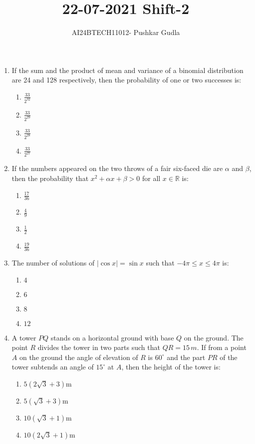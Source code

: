 \documentclass[journal,12pt,onecolumn]{IEEEtran}
\theoremstyle{remark}
\begin{document}

\vspace{3cm}

\title{\textbf{22-07-2021 Shift-2}}
\author{AI24BTECH11012- Pushkar Gudla}
\maketitle
\bigskip

\renewcommand{\thefigure}{\theenumi}
\renewcommand{\thetable}{\theenumi}
\setlength{\columnsep}{2.5em}


\begin{enumerate}
    \item If the sum and the product of mean and variance of a binomial distribution are 24 and 128 respectively, then the probability of one or two successes is:
    \begin{enumerate}
        \item $\frac{33}{2^{32}}$
        \item $\frac{33}{2^{29}}$
        \item $\frac{33}{2^{28}}$
        \item $\frac{33}{2^{27}}$
    \end{enumerate}
    
    \item If the numbers appeared on the two throws of a fair six-faced die are $\alpha$ and $\beta$, then the probability that $x^2 + \alpha x + \beta > 0$ for all $x \in \mathbb{R}$ is:
    \begin{enumerate}
        \item $\frac{17}{36}$
        \item $\frac{4}{9}$
        \item $\frac{1}{2}$
        \item $\frac{19}{36}$
    \end{enumerate}

    \item The number of solutions of $|\cos x| = \sin x$ such that $-4\pi \leq x \leq 4\pi$ is:
    \begin{enumerate}
        \item $4$
        \item $6$
        \item $8$
        \item $12$
    \end{enumerate}

    \item A tower $PQ$ stands on a horizontal ground with base $Q$ on the ground. The point $R$ divides the tower in two parts such that $QR = 15 \, m$. If from a point $A$ on the ground the angle of elevation of $R$ is $60^\circ$ and the part $PR$ of the tower subtends an angle of $15^\circ$ at $A$, then the height of the tower is:
    \begin{enumerate}
        \item $5(2\sqrt{3} + 3)$m
        \item $5(\sqrt{3} + 3)$m
        \item $10(\sqrt{3} + 1)$m
        \item $10(2\sqrt{3} + 1)$m
    \end{enumerate}


\end{enumerate}
\end{document}
